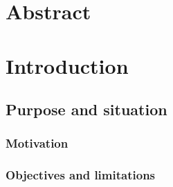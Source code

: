 \documentclass[
    a4paper,      %
    10pt,         %
    openright,    %
    notitlepage,  %
    parskip=half, %
]{scrreprt}       %
\theoremstyle{definition}                    %
\begin{document}


    \chapter*{}
    \label{chap:versions}

    \begin{versionhistory}
        {
        }
    \end{versionhistory}\listoftodos{}

\chapter*{Abstract}
\label{chap:abstract}

\blindtext
\tableofcontents
\cleardoublepage{}


\chapter{Introduction}
\label{chap:introduction}

\blindtext{}
\blindtext{}

\section{Purpose and situation}
\label{sec:purpose}

\subsection{Motivation}
\label{subsec:motivation}

\blindtext{}

\subsection{Objectives and limitations}
\label{subsec:objectives}

\blindtext{}
\end{document}
